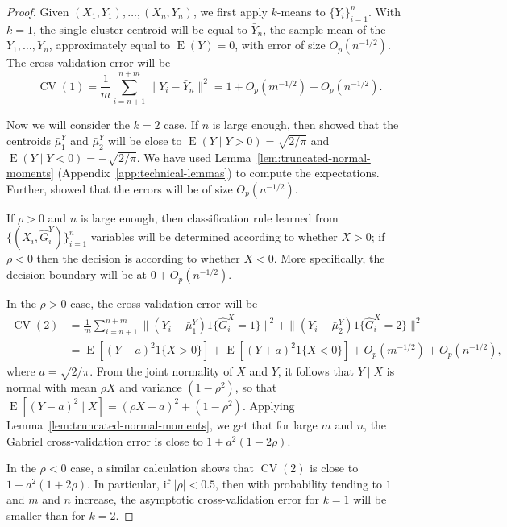 \documentclass[12pt]{article}
\newcommand{\CV}{\operatorname{CV}}
\newcommand{\E}{\operatorname{E}}
\newcommand{\OhP}{O_p}
\newcommand{\bmuY}{\bar \mu^{Y}}
\newcommand{\hGX}{\hat G^{X}}
\newcommand{\hGY}{\hat G^{Y}}
\begin{document}
\begin{proof}
Given $(X_1, Y_1), \dotsc, (X_n, Y_n)$, we first apply $k$-means to $\{ Y_i
\}_{i=1}^{n}$. With $k = 1$, the single-cluster centroid will
be equal to $\bar Y_n$, the sample mean of the $Y_1, \dotsc, Y_n$, approximately equal to
$\E(Y) = 0$, with error of size $\OhP(n^{-1/2})$. The cross-validation error
will be
\[
  \CV(1) = \frac{1}{m} \sum_{i=n+1}^{n+m} \| Y_i - \bar Y_n \|^2
         = 1 + \OhP(m^{-1/2}) + \OhP(n^{-1/2}).
\]

Now we will consider the $k = 2$ case.  If $n$ is large enough, then
\citet{pollard1981strong} showed that the centroids $\bmuY_1$ and $\bmuY_2$
will be close to $\E(Y \mid Y > 0) = \sqrt{2/\pi}$ and $\E(Y \mid Y < 0) =
-\sqrt{2/\pi}$.  We have used Lemma~\ref{lem:truncated-normal-moments}
(Appendix~\ref{app:technical-lemmas}) to compute the expectations.  Further,
\citet{pollard1982central} showed that the errors will be of size $\OhP(n^{-1/2})$.

If $\rho > 0$ and $n$ is large enough, then classification rule learned from
$\{(X_i, \hGY_i)\}_{i=1}^{n}$ variables will be determined according to
whether $X > 0$; if $\rho < 0$ then the decision is according to whether $X <
0$.  More specifically, the decision boundary will be at $0 + \OhP(n^{-1/2})$.

In the $\rho > 0$ case, the cross-validation error will be
\begin{align*}
  \CV(2)
  &=
    \frac{1}{m}
    \sum_{i=n+1}^{n+m}
      \| (Y_i - \bmuY_1) 1\{\hGX_i = 1\} \|^2
      +
      \| (Y_i - \bmuY_2) 1\{\hGX_i = 2\} \|^2
\\
  &=
    \E[(Y - a)^2 1\{ X > 0\}] + \E[(Y + a)^2 1\{X < 0\}]
      + \OhP(m^{-1/2}) + \OhP(n^{-1/2}),
\end{align*}
where $a = \sqrt{2/\pi}$.  From the joint normality of $X$ and $Y$, it follows
that $Y \mid X$ is normal with mean $\rho X$ and variance $(1 - \rho^2)$, so
that $\E[(Y - a)^2 \mid X] = (\rho X - a)^2 + (1 - \rho^2)$.  Applying
Lemma~\ref{lem:truncated-normal-moments}, we get that for large $m$ and $n$,
the Gabriel cross-validation error is close to
$1 + a^2 (1 - 2 \rho)$.  

In the $\rho < 0$ case, a similar calculation shows that $\CV(2)$ is close to
$1 + a^2 (1 + 2 \rho)$.  In particular, if $|\rho| < 0.5$, then with
probability tending to $1$ and $m$ and $n$ increase, the asymptotic
cross-validation error for $k = 1$ will be smaller than for $k = 2$.
\end{proof}
\end{document}
